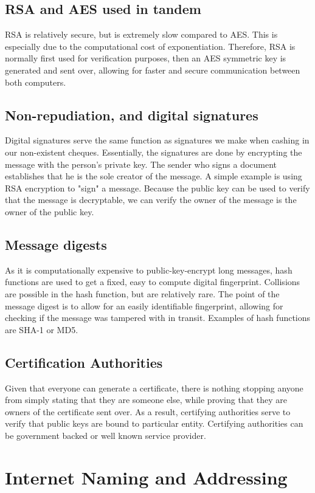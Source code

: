 \documentclass{article}
\begin{document}
\subsection{RSA and AES used in tandem}
RSA is relatively secure, but is extremely slow compared to AES. This is especially due to the computational cost of exponentiation. Therefore, RSA is normally first used for verification purposes, then an AES symmetric key is generated and sent over, allowing for faster and secure communication between both computers.
\subsection{Non-repudiation, and digital signatures}
Digital signatures serve the same function as signatures we make when cashing in our non-existent cheques. Essentially, the signatures are done by encrypting the message with the person's private key. The sender who signs a document establishes that he is the sole creator of the message. A simple example is using RSA encryption to "sign" a message. Because the public key can be used to verify that the message is decryptable, we can verify the owner of the message is the owner of the public key.
\subsection{Message digests}
As it is computationally expensive to public-key-encrypt long messages, hash functions are used to get a fixed, easy to compute digital fingerprint. Collisions are possible in the hash function, but are relatively rare. The point of the message digest is to allow for an easily identifiable fingerprint, allowing for checking if the message was tampered with in transit. Examples of hash functions are SHA-1 or MD5.
\subsection{Certification Authorities}
Given that everyone can generate a certificate, there is nothing stopping anyone from simply stating that they are someone else, while proving that they are owners of the certificate sent over. As a result, certifying authorities serve to verify that public keys are bound to particular entity. Certifying authorities can be government backed or well known service provider.

\section{Internet Naming and Addressing}
\end{document}
